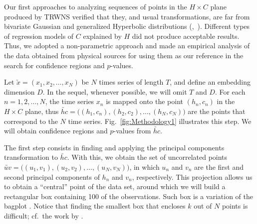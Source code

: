 \documentclass[alpha-refs]{wiley-article}
\newcommand{\Mycite}[1]{%
 (\citeauthor{#1},~\citeyear{#1})}
\begin{document}
Our first approaches to analyzing sequences of points in the $H\times C$ plane produced by TRWNS verified that they, and usual transformations, are far from bivariate Gaussian and generalized Hyperbolic distributions \Mycite{MultivariateDistributionModelswithGeneralizedHyperbolicMargins}.
Different types of regression models of $C$ explained by $H$ did not produce acceptable results.
Thus, we adopted a non-parametric approach and made an empirical analysis of the data obtained from physical sources for using them as our reference in the search for confidence regions and $p$-values.


Let $\utilde{x} =(x_1, x_2, \dots, x_N)$ be $N$ times series of length $T$, and define an embedding dimension $D$.
In the sequel, whenever possible, we will omit $T$ and $D$.
For each $n=1,2,\dots, N$, the time series $x_n$ is mapped onto the point $(h_n,c_n)$ in the $H\times C$ plane, thus $\utilde{hc}=\big((h_1,c_n), (h_2,c_2), \dots, (h_N,c_N)\big)$ are the points that correspond to the $N$ time series.
Fig.~\ref{fig:Methodology1} illustrates this step.
We will obtain confidence regions and $p$-values from $\utilde{hc}$.

The first step consists in finding and applying the principal components transformation to $\utilde{hc}$.
With this, we obtain the set of uncorrelated points $\utilde{uv}=\big((u_1,v_1), (u_2,v_2),\dots,(u_N,v_N)\big)$, in which $u_n$ and $v_n$ are the first and second principal components of $h_n$ and $v_n$, respectively.
This projection allows us to obtain a ``central'' point of the data set, around which we will build a rectangular box containing \SI{100}{\minusalphapercent} of the observations.
Such box is a variation of the bagplot \citep{TheBagplotaBivariateBoxplot}.
Notice that finding the smallest box that encloses $k$ out of $N$ points is difficult; cf.\ the work by \citet{SmallestKEnclosingRectangleRevisited}.
\end{document}
